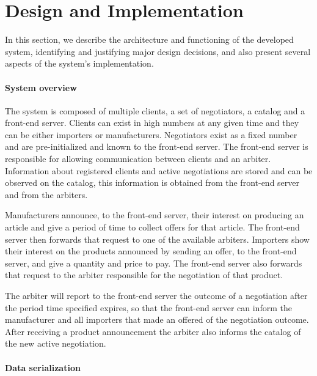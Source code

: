 
\section{Design and Implementation}
\label{sec:design}


In this section, we describe the architecture and functioning of the developed system, identifying and justifying major design decisions, and also present several aspects of the system's implementation.

\paragraph{System overview} 

The system is composed of multiple clients, a set of negotiators, a catalog and a front-end server. Clients can exist in high numbers at any given time and they can be either importers or manufacturers. Negotiators exist as a fixed number and are pre-initialized and known to the front-end server. The front-end server is responsible for allowing communication between clients and an arbiter. Information about registered clients and active negotiations are stored and can be observed on the catalog, this information is obtained from the front-end server and from the arbiters. 

Manufacturers announce, to the front-end server, their interest on producing an article and give a period of time to collect offers for that article. The front-end server then forwards that request to one of the available arbiters.
Importers show their interest on the products announced by sending an offer, to the front-end server, and give a quantity and price to pay. The front-end server also forwards that request to the arbiter responsible for the negotiation of that product.

The arbiter will report to the front-end server the outcome of a negotiation after the period time specified expires, so that the front-end server can inform the manufacturer and all importers that made an offered of the negotiation outcome. After receiving a product announcement the arbiter also informs the catalog of the new active negotiation.

\paragraph{Data serialization} 

